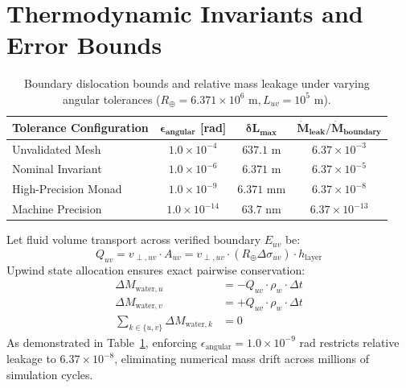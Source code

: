 \documentclass[11pt,a4paper]{article}
\begin{document}
\section{Thermodynamic Invariants and Error Bounds}

\begin{table}[t]
\centering
\caption{Boundary dislocation bounds and relative mass leakage under varying angular tolerances ($R_{\oplus} = 6.371 \times 10^6\text{ m}, L_{uv} = 10^5\text{ m}$).}
\label{tab:leakage}
\begin{tabular}{lccc}
\toprule
\textbf{Tolerance Configuration} & $\mathbf{\epsilon_{\text{angular}}}$ \textbf{[rad]} & $\mathbf{\delta L_{\max}}$ & $\mathbf{\dot{M}_{\text{leak}} / \dot{M}_{\text{boundary}}}$ \\
\midrule
Unvalidated Mesh & $1.0 \times 10^{-4}$ & $637.1\text{ m}$ & $6.37 \times 10^{-3}$ \\
Nominal Invariant & $1.0 \times 10^{-6}$ & $6.371\text{ m}$ & $6.37 \times 10^{-5}$ \\
High-Precision Monad & $1.0 \times 10^{-9}$ & $6.371\text{ mm}$ & $6.37 \times 10^{-8}$ \\
Machine Precision & $1.0 \times 10^{-14}$ & $63.7\text{ nm}$ & $6.37 \times 10^{-13}$ \\
\bottomrule
\end{tabular}
\end{table}

Let fluid volume transport across verified boundary $E_{uv}$ be:
\begin{equation}
Q_{uv} = v_{\perp, uv} \cdot A_{uv} = v_{\perp, uv} \cdot (R_{\oplus} \Delta\sigma_{uv}) \cdot h_{\text{layer}}
\end{equation}
Upwind state allocation ensures exact pairwise conservation:
\begin{align}
\Delta M_{\text{water}, u} &= -Q_{uv} \cdot \rho_w \cdot \Delta t \\
\Delta M_{\text{water}, v} &= +Q_{uv} \cdot \rho_w \cdot \Delta t \\
\sum_{k \in \{u, v\}} \Delta M_{\text{water}, k} &= 0
\end{align}
As demonstrated in Table~\ref{tab:leakage}, enforcing $\epsilon_{\text{angular}} = 1.0 \times 10^{-9}$ rad restricts relative leakage to $6.37 \times 10^{-8}$, eliminating numerical mass drift across millions of simulation cycles.
\end{document}
